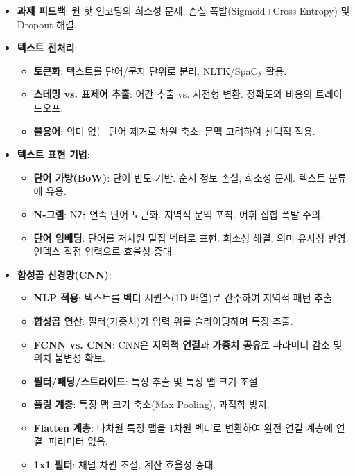 \documentclass[11pt,a4paper]{article}
\theoremstyle{definition}
\begin{document}
\begin{tcolorbox}[summarybox, title=\textbf{CSCI89 Lecture 4 핵심 요약}, fonttitle=\bfseries\large, arc=5mm]
\begin{itemize}
    \item[] \textbf{과제 피드백}: 원-핫 인코딩의 희소성 문제, 손실 폭발(Sigmoid+Cross Entropy) 및 Dropout 해결.
    \item[] \textbf{텍스트 전처리}:
    \begin{itemize}
        \item \textbf{토큰화}: 텍스트를 단어/문자 단위로 분리. NLTK/SpaCy 활용.
        \item \textbf{스테밍 vs. 표제어 추출}: 어간 추출 vs. 사전형 변환. 정확도와 비용의 트레이드오프.
        \item \textbf{불용어}: 의미 없는 단어 제거로 차원 축소. 문맥 고려하여 선택적 적용.
    \end{itemize}
    \item[] \textbf{텍스트 표현 기법}:
    \begin{itemize}
        \item \textbf{단어 가방(BoW)}: 단어 빈도 기반. 순서 정보 손실, 희소성 문제. 텍스트 분류에 유용.
        \item \textbf{N-그램}: N개 연속 단어 토큰화. 지역적 문맥 포착. 어휘 집합 폭발 주의.
        \item \textbf{단어 임베딩}: 단어를 저차원 밀집 벡터로 표현. 희소성 해결, 의미 유사성 반영. 인덱스 직접 입력으로 효율성 증대.
    \end{itemize}
    \item[] \textbf{합성곱 신경망(CNN)}:
    \begin{itemize}
        \item \textbf{NLP 적용}: 텍스트를 벡터 시퀀스(1D 배열)로 간주하여 지역적 패턴 추출.
        \item \textbf{합성곱 연산}: 필터(가중치)가 입력 위를 슬라이딩하며 특징 추출.
        \item \textbf{FCNN vs. CNN}: CNN은 \textbf{지역적 연결}과 \textbf{가중치 공유}로 파라미터 감소 및 위치 불변성 확보.
        \item \textbf{필터/패딩/스트라이드}: 특징 추출 및 특징 맵 크기 조절.
        \item \textbf{풀링 계층}: 특징 맵 크기 축소(Max Pooling), 과적합 방지.
        \item \textbf{Flatten 계층}: 다차원 특징 맵을 1차원 벡터로 변환하여 완전 연결 계층에 연결. 파라미터 없음.
        \item \textbf{1x1 필터}: 채널 차원 조절, 계산 효율성 증대.
    \end{itemize}
\end{itemize}
\end{tcolorbox}
\end{document}
